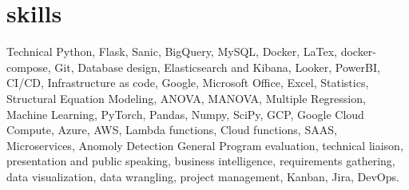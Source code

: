 \documentclass[]{twentysecondcv}
\begin{document}
\section{skills}
	\begin{twentyshort}
	\twentyitemshort
	{Technical}
	{Python, Flask, Sanic, BigQuery, MySQL, Docker, LaTex, docker-compose, Git, Database design, Elasticsearch and Kibana, Looker, PowerBI, CI/CD, Infrastructure as code, Google, Microsoft Office, Excel, Statistics, Structural Equation Modeling, ANOVA, MANOVA, Multiple Regression, Machine Learning, PyTorch, Pandas, Numpy, SciPy, GCP, Google Cloud Compute, Azure, AWS, Lambda functions, Cloud functions, SAAS, Microservices, Anomoly Detection}
	\twentyitemshort
	{General}
	{Program evaluation, technical liaison, presentation and public speaking, business intelligence, requirements gathering, data visualization, data wrangling, project management, Kanban, Jira, DevOps.}
	\end{twentyshort}

\end{document}
